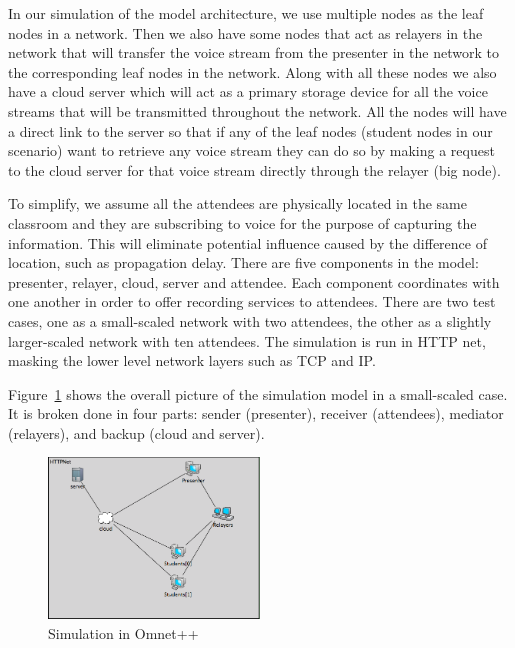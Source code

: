 In our simulation of the model architecture, we use multiple nodes
as the leaf nodes in a network.
Then we also have some nodes that act as relayers in the network that will
transfer the voice stream from the presenter in the network to
the corresponding leaf nodes in the network. Along with all these nodes we also
have a cloud server which will act as a primary storage device for all the
voice streams that will be transmitted throughout the network. All the nodes will
have a direct link to the server so that if any of the leaf nodes (student
nodes in our scenario) want to retrieve any voice stream they can do so by
making a request to
the cloud server for that voice stream directly through the relayer (big node).

To simplify, we assume all the attendees are physically located in the same
classroom and they are subscribing to voice for the purpose of capturing the
information. This will eliminate potential influence caused by the difference
of
location, such as propagation delay. There are five components in the model:
presenter, relayer, cloud, server and attendee. Each component coordinates with
one another in order to offer recording services to attendees. There are two
test cases, one as a small-scaled network with two attendees, the other as a
slightly larger-scaled network with ten attendees. The simulation
is run in HTTP net,
masking the lower level network layers such as TCP and IP.



Figure~\ref{fig:sce} shows the overall picture of the simulation model in a
small-scaled case. It is broken done in four parts: sender (presenter), receiver (attendees),
mediator (relayers), and backup (cloud and server).

\begin{figure}[h!]
  \centering
    \includegraphics[width=0.5\textwidth]{figures/sce.png}
  \caption{Simulation in Omnet++}
  \label{fig:sce}
\end{figure}

